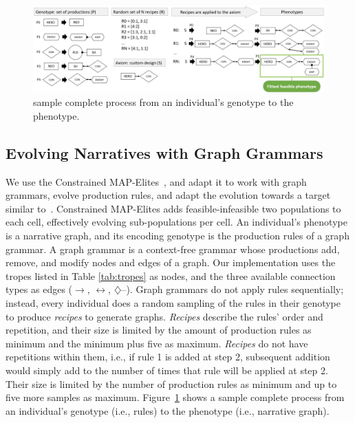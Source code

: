 \begin{figure}[t]
    \centering
    \includegraphics[width=\textwidth]{figures/gen2seq.jpg}
    \caption{sample complete process from an individual's genotype to the phenotype.}
    \label{fig:gen2phen}
\end{figure}


\subsection{Evolving Narratives with Graph Grammars} \label{sec:evolvingNarratives}

We use the Constrained MAP-Elites~, and adapt it to work with graph grammars, evolve production rules, and adapt the evolution towards a target similar to~. Constrained MAP-Elites adds feasible-infeasible two populations to each cell, effectively evolving sub-populations per cell. An individual's phenotype is a narrative graph, and its encoding genotype is the production rules of a graph grammar. A graph grammar is a context-free grammar whose productions add, remove, and modify nodes and edges of a graph. Our implementation uses the tropes listed in Table \ref{tab:tropes} as nodes, and the three available connection types as edges ($\rightarrow$, $\leftrightarrow$, $\diamondsuit$--). Graph grammars do not apply rules sequentially; instead, every individual does a random sampling of the rules in their genotype to produce \emph{recipes} to generate graphs. \emph{Recipes} describe the rules' order and repetition, and their size is limited by the amount of production rules as minimum and the minimum plus five as maximum. \emph{Recipes} do not have repetitions within them, i.e., if rule 1 is added at step 2, subsequent addition would simply add to the number of times that rule will be applied at step 2. Their size is limited by the number of production rules as minimum and up to five more samples as maximum. Figure~\ref{fig:gen2phen} shows a sample complete process from an individual's genotype (i.e., rules) to the phenotype (i.e., narrative graph).

